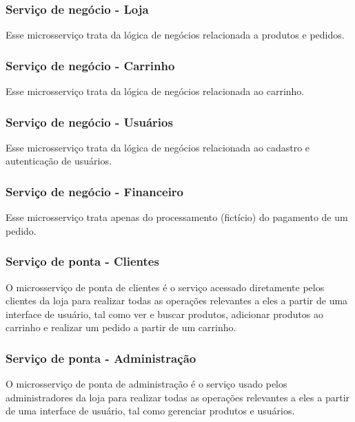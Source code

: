 \subsubsection*{Serviço de negócio - Loja}
Esse microsserviço trata da lógica de negócios relacionada a produtos e pedidos.

\subsubsection*{Serviço de negócio - Carrinho}
Esse microsserviço trata da lógica de negócios relacionada ao carrinho.

\subsubsection*{Serviço de negócio - Usuários}
Esse microsserviço trata da lógica de negócios relacionada ao cadastro e autenticação de usuários.

\subsubsection*{Serviço de negócio - Financeiro}
Esse microsserviço trata apenas do processamento (fictício) do pagamento de um pedido.

\subsubsection*{Serviço de ponta - Clientes}
O microsserviço de ponta de clientes é o serviço acessado diretamente pelos clientes da loja para realizar todas as operações relevantes a eles a partir de uma interface de usuário, tal como ver e buscar produtos, adicionar produtos ao carrinho e realizar um pedido a partir de um carrinho.

\subsubsection*{Serviço de ponta - Administração}
O microsserviço de ponta de administração é o serviço usado pelos administradores da loja para realizar todas as operações relevantes a eles a partir de uma interface de usuário, tal como gerenciar produtos e usuários.


